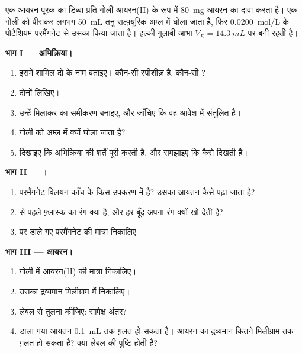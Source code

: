 \begin{problem}
\label{pb:g11:titration:1}
एक आयरन पूरक का डिब्बा प्रति गोली आयरन(II) के रूप में \qty{80}{mg} आयरन का
दावा करता है। एक गोली को पीसकर लगभग \qty{50}{mL}
तनु सल्फ़्यूरिक अम्ल में घोला जाता है, फिर \qty{0.0200}{mol/L} के पोटैशियम परमैंगनेट
से उसका  किया जाता है। हल्की गुलाबी आभा $V_E = \qty{14.3}{mL}$ पर बनी रहती है।

\medskip
\noindent\textbf{भाग I --- अभिक्रिया।}
\begin{enumerate}
  \item इसमें शामिल दो  के नाम बताइए। कौन-सी स्पीशीज़
         है, कौन-सी ?
  \item दोनों  लिखिए।
  \item उन्हें मिलाकर  का समीकरण बनाइए, और जाँचिए कि
        वह आवेश में संतुलित है।
  \item गोली को अम्ल में क्यों घोला जाता है?
  \item दिखाइए कि अभिक्रिया  की शर्तें पूरी करती है, और
        समझाइए कि  कैसे दिखती है।
\end{enumerate}

\medskip
\noindent\textbf{भाग II --- ।}
\begin{enumerate}[resume]
  \item परमैंगनेट विलयन काँच के किस उपकरण में है? उसका आयतन कैसे
        पढ़ा जाता है?
  \item {} से पहले फ़्लास्क का रंग क्या है, और हर
        बूँद अपना रंग क्यों खो देती है?
  \item {} पर डाले गए परमैंगनेट की मात्रा निकालिए।
\end{enumerate}

\medskip
\noindent\textbf{भाग III --- आयरन।}
\begin{enumerate}[resume]
  \item गोली में आयरन(II) की मात्रा निकालिए।
  \item उसका द्रव्यमान मिलीग्राम में निकालिए।
  \item लेबल से तुलना कीजिए: सापेक्ष अंतर?
  \item डाला गया आयतन \qty{0.1}{mL} तक ग़लत हो सकता है। आयरन का द्रव्यमान कितने
        मिलीग्राम तक ग़लत हो सकता है? क्या लेबल की पुष्टि होती है?
\end{enumerate}


\end{problem}
